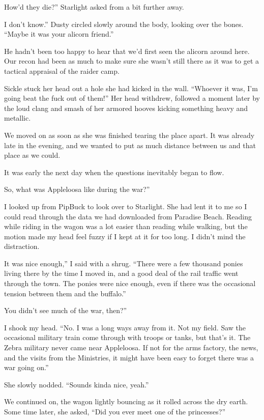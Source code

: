 \leavevmode{}How’d they die?” Starlight asked from a bit further away.

\leavevmode{}I don’t know.” Dusty circled slowly around the body, looking over the bones. “Maybe it was your alicorn friend.”

He hadn’t been too happy to hear that we’d first seen the alicorn around here. Our recon had been as much to make sure she wasn’t still there as it was to get a tactical appraisal of the raider camp.

Sickle stuck her head out a hole she had kicked in the wall. “Whoever it was, I’m going beat the fuck out of them!” Her head withdrew, followed a moment later by the loud clang and smash of her armored hooves kicking something heavy and metallic.

We moved on as soon as she was finished tearing the place apart. It was already late in the evening, and we wanted to put as much distance between us and that place as we could.

{\br}%
It was early the next day when the questions inevitably began to flow.

\leavevmode{}So, what was Appleloosa like during the war?”

I looked up from PipBuck to look over to Starlight. She had lent it to me so I could read through the data we had downloaded from Paradise Beach. Reading while riding in the wagon was a lot easier than reading while walking, but the motion made my head feel fuzzy if I kept at it for too long. I didn’t mind the distraction.

\leavevmode{}It was nice enough,” I said with a shrug. “There were a few thousand ponies living there by the time I moved in, and a good deal of the rail traffic went through the town. The ponies were nice enough, even if there was the occasional tension between them and the buffalo.”

\leavevmode{}You didn’t see much of the war, then?”

I shook my head. “No. I was a long ways away from it. Not my field. Saw the occasional military train come through with troops or tanks, but that’s it. The Zebra military never came near Appleloosa. If not for the arms factory, the news, and the visits from the Ministries, it might have been easy to forget there was a war going on.”

She slowly nodded. “Sounds kinda nice, yeah.”

We continued on, the wagon lightly bouncing as it rolled across the dry earth. Some time later, she asked, “Did you ever meet one of the princesses?”

